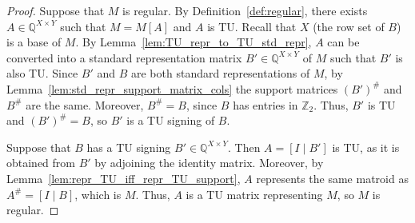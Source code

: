 \begin{proof}
    Suppose that $M$ is regular. By Definition~\ref{def:regular}, there exists $A \in \mathbb{Q}^{X \times Y}$ such that $M = M[A]$ and $A$ is TU. Recall that $X$ (the row set of $B$) is a base of $M$. By Lemma~\ref{lem:TU_repr_to_TU_std_repr}, $A$ can be converted into a standard representation matrix $B' \in \mathbb{Q}^{X \times Y}$ of $M$ such that $B'$ is also TU. Since $B'$ and $B$ are both standard representations of $M$, by Lemma~\ref{lem:std_repr_support_matrix_cols} the support matrices $(B')^{\#}$ and $B^{\#}$ are the same. Moreover, $B^{\#} = B$, since $B$ has entries in $\mathbb{Z}_{2}$. Thus, $B'$ is TU and $(B')^{\#} = B$, so $B'$ is a TU signing of $B$.

    Suppose that $B$ has a TU signing $B' \in \mathbb{Q}^{X \times Y}$. Then $A = [I \mid B']$ is TU, as it is obtained from $B'$ by adjoining the identity matrix. Moreover, by Lemma~\ref{lem:repr_TU_iff_repr_TU_support}, $A$ represents the same matroid as $A^{\#} = [I \mid B]$, which is $M$. Thus, $A$ is a TU matrix representing $M$, so $M$ is regular.
\end{proof}
